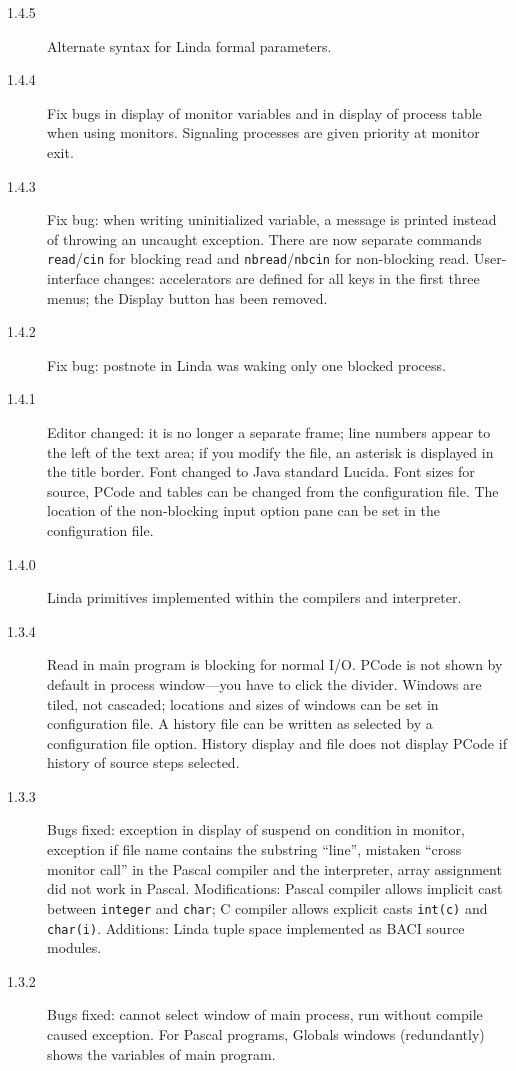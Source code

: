 \documentclass[11pt]{article}
\newcommand{\baci}{\textsc{\sffamily BACI}}
\newcommand{\p}[1]{\texttt{#1}}
\newcommand{\bu}[1]{\textsf{#1}}
\begin{document}
\begin{description}
\item[1.4.5] Alternate syntax for Linda formal parameters.
\item[1.4.4] Fix bugs in display of monitor variables and in display of
process table when using monitors.
Signaling processes are given priority at monitor exit.
\item[1.4.3] Fix bug: when writing uninitialized variable,
a message is printed instead of throwing an uncaught exception.
There are now separate commands \p{read}/\p{cin} for blocking read
and \p{nbread}/\p{nbcin} for non-blocking read.
User-interface changes: accelerators are defined for all keys in the first three menus;
the \bu{Display} button has been removed.
\item[1.4.2] Fix bug: postnote in Linda was waking only one blocked process.
\item[1.4.1] Editor changed: it is no longer a separate frame; line numbers
appear to the left of the text area; if you modify the file,
an asterisk is displayed in the title border.
Font changed to Java standard Lucida.
Font sizes for source, PCode and tables can be changed from
the configuration file.
The location of the non-blocking input option pane can be set in the configuration file.
\item[1.4.0] Linda primitives implemented within the compilers and interpreter.
\item[1.3.4] Read in main program is blocking for normal I/O.
PCode is not shown by default in process window---you have to click the divider.
Windows are tiled, not cascaded; locations and sizes of windows
can be set in configuration file.
A history file can be written as selected by a configuration file option.
History display and file does not display PCode if history of source steps selected.
\item[1.3.3] Bugs fixed: exception in display of suspend on condition in monitor,
exception if file name contains the substring ``line'',
mistaken ``cross monitor call'' in the Pascal compiler and the interpreter,
array assignment did not work in Pascal.
Modifications: Pascal compiler allows implicit cast between \p{integer} and \p{char};
C compiler allows explicit casts \p{int(c)} and \p{char(i)}.
Additions: Linda tuple space implemented as \baci{} source modules.
\item[1.3.2] Bugs fixed: cannot select window of main process,
run without compile caused exception.
For Pascal programs, Globals windows (redundantly) shows the
variables of main program.

\end{description}
\end{document}
